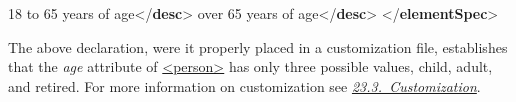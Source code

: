 \begin{shaded}
\hspace*{1em}\hspace*{1em}\hspace*{1em}\mbox{}\newline 
\hspace*{1em}\hspace*{1em}\hspace*{1em}\hspace*{1em}18 to 65 years of age{</\textbf{desc}>}\mbox{}\newline 
\hspace*{1em}\hspace*{1em}\hspace*{1em}\mbox{}\newline 
\hspace*{1em}\hspace*{1em}\hspace*{1em}\mbox{}\newline 
\hspace*{1em}\hspace*{1em}\hspace*{1em}\hspace*{1em}over 65 years of age{</\textbf{desc}>}\mbox{}\newline 
\hspace*{1em}\hspace*{1em}\hspace*{1em}\mbox{}\newline 
\hspace*{1em}\hspace*{1em}\mbox{}\newline 
\hspace*{1em}\mbox{}\newline 
{}\mbox{}\newline 
{</\textbf{elementSpec}>}\end{shaded}\egroup\par \noindent  The above declaration, were it properly placed in a customization file, establishes that the {\itshape age} attribute of \hyperref[TEI.person]{<person>} has only three possible values, child, adult, and retired. For more information on customization see \textit{\hyperref[MD]{23.3.\ Customization}}.\par
